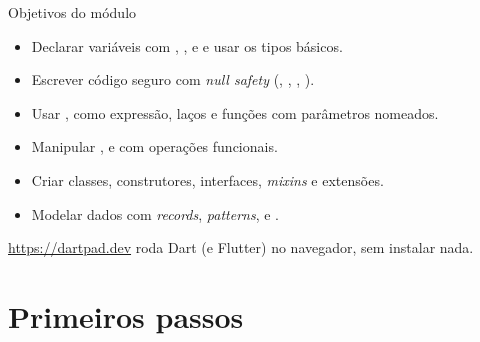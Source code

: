\documentclass[aspectratio=169,10pt]{beamer}
\begin{document}
\capa

\begin{frame}{Objetivos do módulo}
  \begin{conceito}
    \begin{itemize}
      \item Declarar variáveis com , ,  e  e usar os tipos básicos.
      \item Escrever código seguro com \emph{null safety} (, , , \cod{!}).
      \item Usar ,  como expressão, laços e funções com parâmetros nomeados.
      \item Manipular ,  e  com operações funcionais.
      \item Criar classes, construtores, interfaces, \emph{mixins} e extensões.
      \item Modelar dados com \emph{records}, \emph{patterns},  e .
    \end{itemize}
  \end{conceito}
  \begin{dica}
    \url{https://dartpad.dev} roda Dart (e Flutter) no navegador, sem instalar nada.
  \end{dica}
\end{frame}

\sumario



\section{Primeiros passos}
\end{document}
